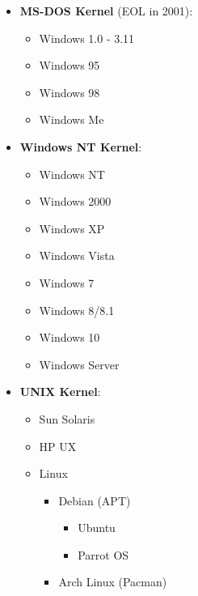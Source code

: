 \begin{itemize}
\tightlist
\item
  \textbf{MS-DOS Kernel} (EOL in 2001):

  \begin{itemize}
  \tightlist
  \item
    Windows 1.0 - 3.11
  \item
    Windows 95
  \item
    Windows 98
  \item
    Windows Me
  \end{itemize}
\item
  \textbf{Windows NT Kernel}:

  \begin{itemize}
  \tightlist
  \item
    Windows NT
  \item
    Windows 2000
  \item
    Windows XP
  \item
    Windows Vista
  \item
    Windows 7
  \item
    Windows 8/8.1
  \item
    Windows 10
  \item
    Windows Server
  \end{itemize}
\item
  \textbf{UNIX Kernel}:

  \begin{itemize}
  \tightlist
  \item
    Sun Solaris
  \item
    HP UX
  \item
    Linux

    \begin{itemize}
    \tightlist
    \item
      Debian (APT)

      \begin{itemize}
      \tightlist
      \item
        Ubuntu
      \item
        Parrot OS
      \end{itemize}
    \item
      Arch Linux (Pacman)


\end{itemize}
\end{itemize}
\end{itemize}
